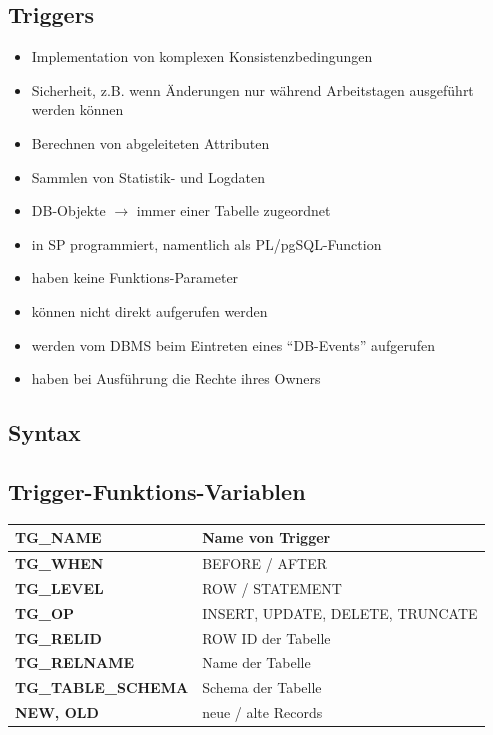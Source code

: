 \documentclass[a4paper, landscape, 8pt]{scrartcl}
\begin{document}
\begin{multicols*}{4}
        \section{Triggers}
        \begin{itemize}
            \item Implementation von komplexen Konsistenzbedingungen
            \item Sicherheit, z.B. wenn Änderungen nur während Arbeitstagen ausgeführt werden können
            \item Berechnen von abgeleiteten Attributen
            \item Sammlen von Statistik- und Logdaten
            \item DB-Objekte $\to$ immer einer Tabelle zugeordnet
            \item in SP programmiert, namentlich als PL/pgSQL-Function
            \item haben keine Funktions-Parameter
            \item können nicht direkt aufgerufen werden
            \item werden vom DBMS beim Eintreten eines \enquote{DB-Events} aufgerufen
            \item haben bei Ausführung die Rechte ihres Owners
        \end{itemize}

        \subsection{Syntax}

        \subsection{Trigger-Funktions-Variablen}
        \begin{tabularx}{\columnwidth}{l | X}
            \textbf{TG\_NAME} & Name von Trigger \\
            \hline
            \textbf{TG\_WHEN} & BEFORE / AFTER \\
            \hline
            \textbf{TG\_LEVEL} & ROW / STATEMENT \\
            \hline
            \textbf{TG\_OP} & INSERT, UPDATE, DELETE, TRUNCATE \\
            \hline
            \textbf{TG\_RELID} & ROW ID der Tabelle \\
            \hline
            \textbf{TG\_RELNAME} & Name der Tabelle \\
            \hline
            \textbf{TG\_TABLE\_SCHEMA} & Schema der Tabelle \\
            \hline
            \textbf{NEW, OLD} & neue / alte Records
        \end{tabularx}


\end{multicols*}
\end{document}
